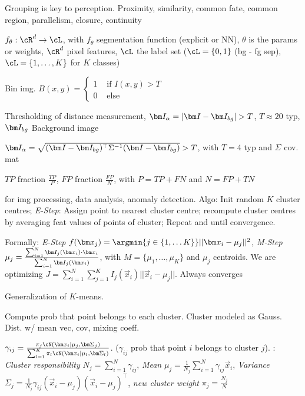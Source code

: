  Grouping is key to perception.  Proximity, similarity, common fate, common region, parallelism, closure, continuity

\shortdefinition[Segmentation] $f_\theta : \cR^d \rightarrow \cL$, with $f_\theta$ segmentation function (explicit or NN), $\theta$ is the params or weights,
$\cR^d$ pixel features, $\cL$ the label set ($\cL = \{ 0, 1 \}$ (bg - fg sep), $\cL = \{ 1, \ldots, K \}$ for $K$ classes)

\shortdefinition[Tresholding] Bin img. $B(x, y) = \begin{cases}
        1 & \text{ if } I(x, y) > T \\
        0 & \text{ else }
    \end{cases}$

 Thresholding of distance measurement, $\mat{I}_\alpha = |\mat{I} - \mat{I}_{bg}| > T$, $T \approx 20$ typ, $\mat{I}_{bg}$ Background image

 $\mat{I}_\alpha = \sqrt{(\mat{I} - \mat{I}_{bg})^\top \Sigma^{-1}(\mat{I} - \mat{I}_{bg})} > T$, with $T = 4$ typ and $\Sigma$ cov. mat

 $TP$ fraction $\frac{TP}{P}$, $FP$ fraction $\frac{FP}{N}$, with $P = TP + FN$ and $N = FP + TN$

\shortdefinition[K-means] for img processing, data analysis, anomaly detection. Algo:  Init random $K$ cluster centres;
 \textit{E-Step}: Assign point to nearest cluster centre;   recompute cluster centres by averaging feat values of points of cluster;
 Repeat  and  until convergence.

Formally: \textit{E-Step} $f(\vec{x}_j) = \argmin{j \in \{ 1, \ldots K \}} ||\vec{x}_i - \mu_j||^2$,
\textit{M-Step} $\mu_j = \frac{\sum_{i = 1}^{N} \mat{I}_j(\vec{x_i}) \cdot \vec{x}_i}{\sum_{i = 1}^{N} \mat{I}_j(\vec{x}_i)}$,
with $M = \{ \mu_1, \ldots, \mu_K\}$ and $\mu_j$ centroids.
We are optimizing $J = \sum_{i = 1}^{N} \sum_{j = 1}^{K} I_j(\vec{x}_i) ||\vec{x}_i - \mu_j||$. Always converges

 Generalization of $K$-means.

Compute prob that point belongs to each cluster. Cluster modeled as Gauss. Dist. w/ mean vec, cov, mixing coeff.

 $\gamma_{ij} = \frac{\pi_j \cN(\vec{x}_i | \mu_j, \mat{\Sigma}_j)}{\sum_{l = 1}^{K} \pi_l \cN(\vec{x}_i | \mu_l, \mat{\Sigma}_l)}$.
($\gamma_{ij}$ prob that point $i$ belongs to cluster $j$).
: \textit{Cluster responsibility} $N_j = \sum_{i = 1}^{N} \gamma_{ij}$, \textit{Mean} $\mu_j = \frac{1}{N_j} \sum_{i = 1}^{N} \gamma_{ij} \vec{x}_i$,
\textit{Variance} $\Sigma_j = \frac{1}{N_j} \gamma_{ij} (\vec{x}_i - \mu_j)(\vec{x}_i - \mu_j)^\top$, \textit{new cluster weight} $\pi_j = \frac{N_j}{N}$

